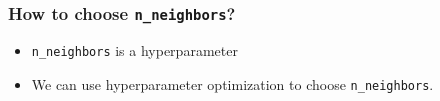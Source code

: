 \documentclass[11pt]{article}
\providecommand{\tightlist}{%
      \setlength{\itemsep}{0pt}\setlength{\parskip}{0pt}}
\begin{document}
    \begin{center}
    \end{center}
    { \hspace*{\fill} \\}
    
    \subsubsection{\texorpdfstring{How to choose
\texttt{n\_neighbors}?}{How to choose n\_neighbors?}}\label{how-to-choose-n_neighbors}

\begin{itemize}
\tightlist
\item
  \texttt{n\_neighbors} is a hyperparameter
\item
  We can use hyperparameter optimization to choose
  \texttt{n\_neighbors}.
\end{itemize}
\end{document}
